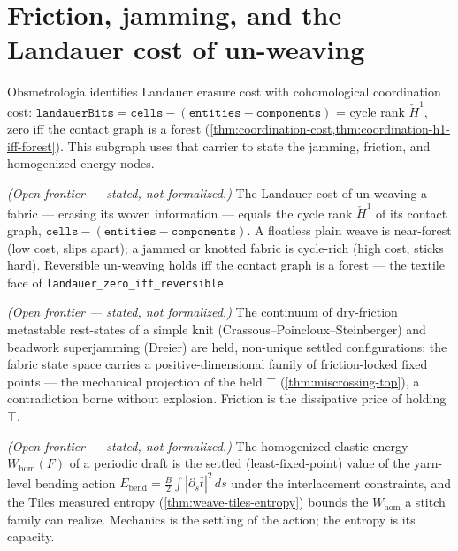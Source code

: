\section{Friction, jamming, and the Landauer cost of un-weaving}

Obsmetrologia identifies Landauer erasure cost with cohomological coordination cost:
$\texttt{landauerBits} = \texttt{cells} - (\texttt{entities} - \texttt{components})$ = cycle
rank $\check H^1$, zero iff the contact graph is a forest
(\cref{thm:coordination-cost,thm:coordination-h1-iff-forest}).  This subgraph
uses that carrier to state the jamming, friction, and homogenized-energy nodes.

\begin{theorem}\label{thm:unweaving-is-landauer}\notready{}
\emph{(Open frontier --- stated, not formalized.)} The Landauer cost of un-weaving a
fabric --- erasing its woven information --- equals the cycle rank $\check H^1$ of its
contact graph, $\texttt{cells} - (\texttt{entities} - \texttt{components})$. A floatless
plain weave is near-forest (low cost, slips apart); a jammed or knotted fabric is
cycle-rich (high cost, sticks hard). Reversible un-weaving holds iff the contact graph is a
forest --- the textile face of \texttt{landauer\_zero\_iff\_reversible}.
\end{theorem}

\begin{theorem}\label{thm:friction-metastability-held}\notready{}
\emph{(Open frontier --- stated, not formalized.)} The continuum of dry-friction
metastable rest-states of a simple knit (Crassous--Poincloux--Steinberger) and beadwork
superjamming (Dreier) are held, non-unique settled configurations: the fabric state space
carries a positive-dimensional family of friction-locked fixed points --- the mechanical
projection of the held $\top$ (\cref{thm:miscrossing-top}), a contradiction borne without
explosion. Friction is the dissipative price of holding $\top$.
\end{theorem}

\begin{theorem}\label{thm:homogenized-energy-settled}\notready{}
\emph{(Open frontier --- stated, not formalized.)} The homogenized elastic energy
$W_{\mathrm{hom}}(F)$ of a periodic draft is the settled (least-fixed-point) value of the
yarn-level bending action $E_{\mathrm{bend}} = \tfrac{B}{2}\int|\partial_s\hat t|^2\,ds$
under the interlacement constraints, and the Tiles measured entropy
(\cref{thm:weave-tiles-entropy}) bounds the $W_{\mathrm{hom}}$ a stitch family can
realize. Mechanics is the settling of the action; the entropy is its capacity.
\end{theorem}
